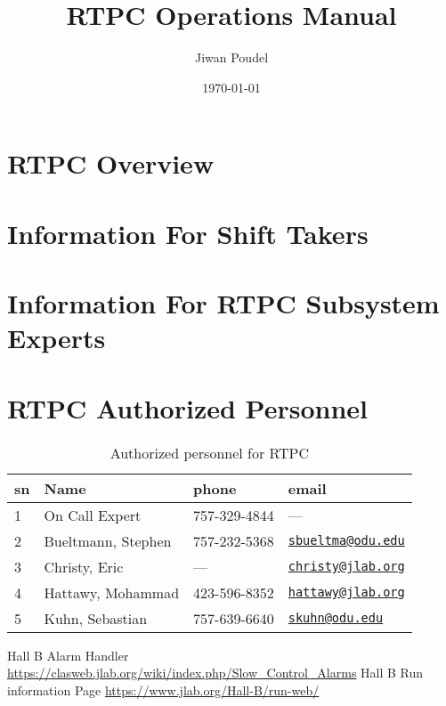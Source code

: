 \documentclass[12pt, hidelinks, oneside]{article}
\title{ \bf  RTPC Operations Manual}
\author{Jiwan Poudel}
\date{\today}
\begin{document}
	
	
	\tableofcontents
	\thispagestyle{empty}
	\cleardoublepage
	
	\setcounter{page}{1}
	
	\section{RTPC Overview}
		
	
	\section{Information For Shift Takers}
		
		
	\section{Information For RTPC Subsystem Experts}
		
	
	\section{RTPC Authorized Personnel}
	\begin{table}[H]
		\centering
		\caption{Authorized personnel for RTPC}
	\begin{tabular}{|l|l|l|l|}
		\hline
		sn & Name & phone & email\\
		\hline
		1 & On Call Expert & 757-329-4844 & ---\\
		\hline
		2 & Bueltmann, Stephen & 757-232-5368 & \href{mailto:sbueltma@odu.edu}{\nolinkurl{sbueltma@odu.edu}}\\
		\hline
		3 & Christy, Eric & --- & \href{mailto:christy@jlab.org}{\nolinkurl{christy@jlab.org}}\\
		\hline
		4 & Hattawy, Mohammad & 423-596-8352 & \href{mailto:hattawy@jlab.org}{\nolinkurl{hattawy@jlab.org}}\\
		\hline
		5 & Kuhn, Sebastian & 757-639-6640 & \href{mailto:skuhn@odu.edu}{\nolinkurl{skuhn@odu.edu}}\\
		\hline
	\end{tabular}
	\end{table}
 


\begin{thebibliography}{9}
	 Hall B Alarm Handler \url{https://clasweb.jlab.org/wiki/index.php/Slow_Control_Alarms}
	 Hall B Run information Page  \url{https://www.jlab.org/Hall-B/run-web/}
\end{thebibliography} 
\newpage
\end{document}
